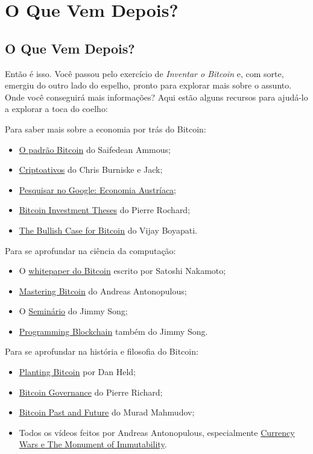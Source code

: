 \part{O Que Vem Depois?}
\label{ch:capitulo10}
\chapter*{O Que Vem Depois?}

Então é isso. Você passou pelo exercício de \textit{Inventar o Bitcoin} e, com sorte, emergiu do outro lado do espelho, pronto para explorar mais sobre o assunto. Onde você conseguirá mais informações? Aqui estão alguns recursos para ajudá-lo a explorar a toca do coelho:

Para saber mais sobre a economia por trás do Bitcoin:

\begin{itemize}
\item \href{https://amzn.to/2V1vQ62}{O padrão Bitcoin} do Saifedean Ammous;
\item \href{https://amzn.to/3jwpiG7}{Criptoativos} do Chris Burniske e Jack;
\item \href{https://tinyurl.com/bzrkbb5u}{Pesquisar no Google: Economia Austríaca};
\item \href{https://tinyurl.com/3yn8amt3}{Bitcoin Investment Theses} do Pierre Rochard;
\item \href{https://tinyurl.com/f8e4wn5h}{The Bullish Case for Bitcoin} do Vijay Boyapati.
\end{itemize}

Para se aprofundar na ciência da computação:

\begin{itemize}
\item O \href{https://bitcoin.org/bitcoin.pdf}{whitepaper do Bitcoin} escrito por Satoshi Nakamoto;
\item \href{https://amzn.to/3gOqaUH}{Mastering Bitcoin} do Andreas Antonopulous;
\item O \href{https://programmingblockchain.com/}{Seminário} do Jimmy Song;
\item \href{https://programmingblockchain.gitbook.io/programmingblock}{Programming Blockchain} também do Jimmy Song.
\end{itemize}

Para se aprofundar na história e filosofia do Bitcoin:

\begin{itemize}
\item \href{https://tinyurl.com/3eeszdzk}{Planting Bitcoin} por Dan Held;
\item \href{https://tinyurl.com/mzy6jkz4}{Bitcoin Governance} do Pierre Richard;
\item \href{https://tinyurl.com/y8vueb88}{Bitcoin Past and Future} do Murad Mahmudov;
\item Todos os vídeos feitos por Andreas Antonopulous, especialmente \href{https://www.youtube.com/user/aantonop}{Currency Wars e The Monument of Immutability}.
\end{itemize}

